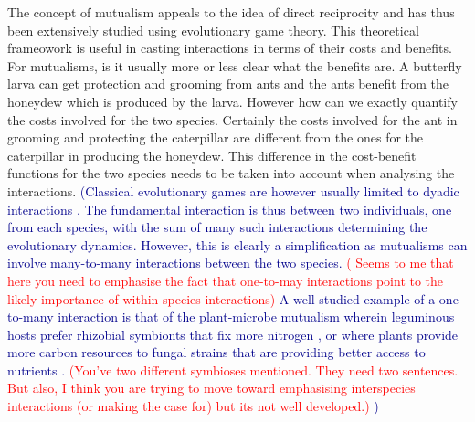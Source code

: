\documentclass[12pt]{article}
\newcommand{\cha}[1]{\textcolor{darkblue}{(#1)}}
\newcommand{\paul}[1]{\textcolor{red}{(#1)}}
\begin{document}
The concept of mutualism appeals to the idea of direct reciprocity \citep{trivers:QRB:1971} and has thus been extensively studied using evolutionary game theory.
This theoretical frameowork is useful in casting interactions in terms of their costs and benefits.
For mutualisms, is it usually more or less clear what the benefits are.
A butterfly larva can get protection and grooming from ants and the ants benefit from the honeydew which is produced by the larva.
However how can we exactly quantify the costs involved for the two species.
Certainly the costs involved for the ant in grooming and protecting the caterpillar are different from the ones for the caterpillar in producing the honeydew.
This difference in the cost-benefit functions for the two species needs to be taken into account when analysing the interactions.
\cha{Classical evolutionary games are however usually limited to dyadic interactions \citep{weibull:book:1995,hofbauer:JMB:1996,hofbauer:book:1998}.
The fundamental interaction is thus between two individuals, one from each species, with the sum of many such interactions determining the evolutionary dynamics.
However, this is clearly a simplification \citep{noe:TREE:1995,noe:book:2001,kiers:Nature:2003,stanton:AmNat:2003,stadler:book:2008} as mutualisms can involve many-to-many interactions between the two species.  
\paul{ Seems to me that here you need to emphasise the fact that one-to-may interactions point to the likely importance of within-species interactions}
A well studied example of a one-to-many interaction is that of the plant-microbe mutualism wherein leguminous hosts prefer rhizobial symbionts that fix more nitrogen \citep{kiers:Nature:2003}, or where plants provide more carbon resources to fungal strains that are providing better access to nutrients \citep{kiers:Science:2011}.
\paul{You've two different symbioses mentioned.  They need two sentences.  But also, I think  you are trying to move toward emphasising interspecies interactions (or making the case for) but its not well developed.}
}
\end{document}
